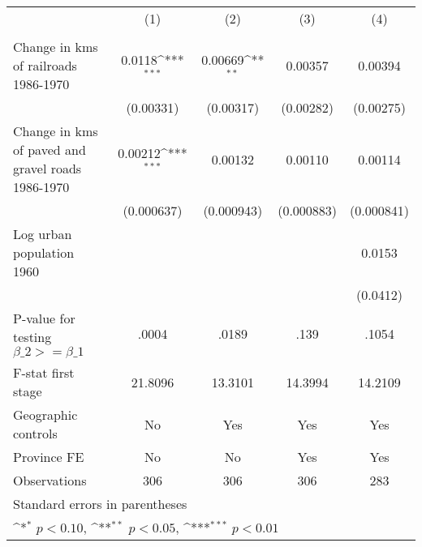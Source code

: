 {
\def\sym#1{\ifmmode^{#1}\else\(^{#1}\)\fi}
\begin{tabular}{l*{4}{c}}
\hline\hline
                &\multicolumn{1}{c}{(1)}&\multicolumn{1}{c}{(2)}&\multicolumn{1}{c}{(3)}&\multicolumn{1}{c}{(4)}\\
                &\multicolumn{1}{c}{}&\multicolumn{1}{c}{}&\multicolumn{1}{c}{}&\multicolumn{1}{c}{}\\
\hline
Change in kms of railroads 1986-1970&   0.0118\sym{***}&  0.00669\sym{**} &  0.00357         &  0.00394         \\
                &(0.00331)         &(0.00317)         &(0.00282)         &(0.00275)         \\
[1em]
Change in kms of paved and gravel roads 1986-1970&  0.00212\sym{***}&  0.00132         &  0.00110         &  0.00114         \\
                &(0.000637)         &(0.000943)         &(0.000883)         &(0.000841)         \\
[1em]
Log urban population 1960&                  &                  &                  &   0.0153         \\
                &                  &                  &                  & (0.0412)         \\
\hline
P-value for testing $\beta\_{2} >= \beta\_{1}$&    .0004         &    .0189         &     .139         &    .1054         \\
F-stat first stage&  21.8096         &  13.3101         &  14.3994         &  14.2109         \\
Geographic controls&       No         &      Yes         &      Yes         &      Yes         \\
Province FE     &       No         &       No         &      Yes         &      Yes         \\
Observations    &      306         &      306         &      306         &      283         \\
\hline\hline
\multicolumn{5}{l}{\footnotesize Standard errors in parentheses}\\
\multicolumn{5}{l}{\footnotesize \sym{*} \(p<0.10\), \sym{**} \(p<0.05\), \sym{***} \(p<0.01\)}\\
\end{tabular}
}
